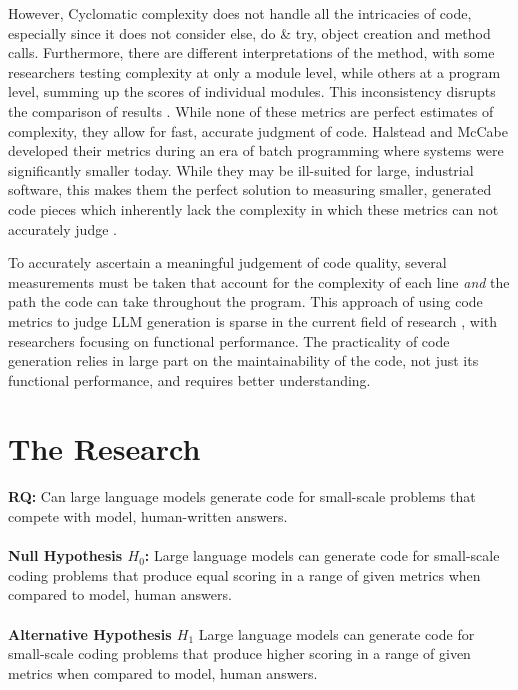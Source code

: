 \documentclass[manuscript,screen,review,sigconf]{acmart}
\begin{document}
However, Cyclomatic complexity does not handle all the intricacies of code, especially since it does not consider else, do \& try, object creation and method calls. Furthermore, there are different interpretations of the method, with some researchers testing complexity at only a module level, while others at a program level, summing up the scores of individual modules. This inconsistency disrupts the comparison of results \cite{McCabeCritique, NoviceCodeWriting}.  While none of these metrics are perfect estimates of complexity, they allow for fast, accurate judgment of code. Halstead and McCabe developed their metrics during an era of batch programming where systems were significantly smaller today. While they may be ill-suited for large, industrial software, this makes them the perfect solution to measuring smaller, generated code pieces which inherently lack the complexity in which these metrics can not accurately judge \cite{metricCritique}.

To accurately ascertain a meaningful judgement of code quality, several measurements must be taken that account for the complexity of each line \textit{and} the path the code can take throughout the program. This approach of using code metrics to judge LLM generation is sparse in the current field of research \cite{CopilotPairProgrammer, CopilotSuggestionsEval}, with researchers focusing on functional performance. The practicality of code generation relies in large part on the maintainability of the code, not just its functional performance, and requires better understanding.

\section{The Research}
\textbf{RQ:} Can large language models generate code for small-scale problems that compete with model, human-written answers.\\\\
\textbf{Null Hypothesis \(H_0\):} Large language models can generate code for small-scale coding problems that produce equal scoring in a range of given metrics when compared to model, human answers.\\\\
\textbf{Alternative Hypothesis \(H_1\)} Large language models can generate code for small-scale coding problems that produce higher scoring in a range of given metrics when compared to model, human answers.
\end{document}
